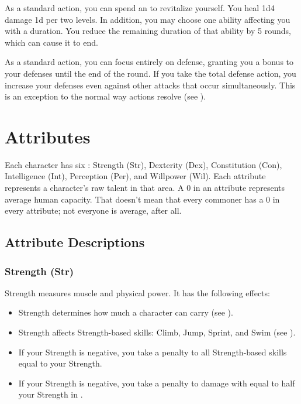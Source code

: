         \label{Recover}
        As a standard action, you can spend an  to revitalize yourself.
        You heal 1d4 damage \add 1d per two levels.
        In addition, you may choose one ability affecting you with a duration.
        You reduce the remaining duration of that ability by 5 rounds, which can cause it to end.

        \label{Total Defense}
        As a standard action, you can focus entirely on defense, granting you a  bonus to your defenses until the end of the round.
        If you take the total defense action, you increase your defenses even against other attacks that occur simultaneously.
        This is an exception to the normal way actions resolve (see ).

\section{Attributes}

    Each character has six : Strength (Str), Dexterity (Dex), Constitution (Con), Intelligence (Int), Perception (Per), and Willpower (Wil).
    Each attribute represents a character's raw talent in that area.
    A 0 in an attribute represents average human capacity.
    That doesn't mean that every commoner has a 0 in every attribute; not everyone is average, after all.

    \subsection{Attribute Descriptions}

        \subsubsection{Strength (Str)}\label{Strength}
            Strength measures muscle and physical power.
            It has the following effects:
            \begin{itemize}
                \item Strength determines how much a character can carry (see ).
                \item Strength affects Strength-based skills: Climb, Jump, Sprint, and Swim (see ).
                \item If your Strength is negative, you take a penalty to all Strength-based skills equal to your Strength.
                \item If your Strength is negative, you take a penalty to damage with  equal to half your Strength in .
            \end{itemize}

